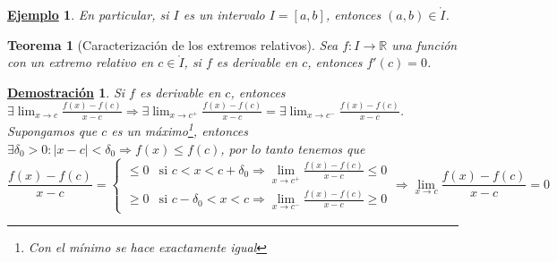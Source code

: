 \documentclass[10pt,a4paper,openright]{book}
\theoremstyle{break}
\newtheorem{theo}{Teorema}[chapter]
\newtheorem*{demo}{\underline{Demostración}}
\newtheorem{ej}{\underline{Ejemplo}}[chapter]
\begin{document}
\begin{ej}
En particular, si $I$ es un intervalo $I=[a,b]$, entonces $(a,b)\in \mathring{I}$.
\end{ej}

\begin{theo}[Caracterización de los extremos relativos]
Sea $f: I\rightarrow \mathbb R$ una función con un extremo relativo en $c\in \mathring{I}$, si $f$ es derivable en $c$, entonces $f'(c)=0$.
\end{theo}
\begin{demo}
Si $f$ es derivable en $c$, entonces $\exists \lim_{x\rightarrow c} \frac{f(x)-f(c)}{x-c}\Rightarrow \exists \lim_{x\rightarrow c^+} \frac{f(x)-f(c)}{x-c} = \exists \lim_{x\rightarrow c^-} \frac{f(x)-f(c)}{x-c}$. Supongamos que $c$ es un máximo\footnote{Con el mínimo se hace exactamente igual}, entonces $\exists\delta_0 >0 : |x-c|<\delta_0\Rightarrow f(x)\leq f(c)$, por lo tanto tenemos que
$$\frac{f(x)-f(c)}{x-c}=\begin{cases}\leq 0 &\mbox{si } c<x<c+\delta_0  \Rightarrow \lim_{x\rightarrow c^+}\frac{f(x)-f(c)}{x-c} \leq 0\\ \geq 0 &\mbox{si } c-\delta_0 < x <c  \Rightarrow \lim_{x\rightarrow c^-}\frac{f(x)-f(c)}{x-c} \geq 0\end{cases}\Rightarrow \lim_{x\rightarrow c}\frac{f(x)-f(c)}{x-c}= 0$$
\end{demo}
\end{document}

